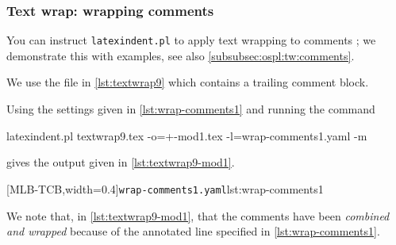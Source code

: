 \subsubsection{Text wrap: wrapping comments}\label{subsubsec:tw:comments}
 You can instruct \texttt{latexindent.pl} to apply text wrapping to comments
 ; we demonstrate this with examples, see also
 \cref{subsubsec:ospl:tw:comments}.  

 \begin{example}
 We use the file in \cref{lst:textwrap9} which contains a trailing comment block.


 Using the settings given in \cref{lst:wrap-comments1} and running the command

 \begin{commandshell}
latexindent.pl textwrap9.tex -o=+-mod1.tex -l=wrap-comments1.yaml -m
   \end{commandshell}

 gives the output given in \cref{lst:textwrap9-mod1}.

 \begin{cmhtcbraster}[raster columns=2,
   raster left skip=-1.5cm,
   raster right skip=-0cm,
   raster column skip=.06\linewidth]
  [MLB-TCB,width=0.4\linewidth]{\texttt{wrap-comments1.yaml}}{lst:wrap-comments1}
 \end{cmhtcbraster}

 We note that, in \cref{lst:textwrap9-mod1}, that the comments have been \emph{combined
 and wrapped} because of the annotated line specified in \cref{lst:wrap-comments1}.
 \end{example}

